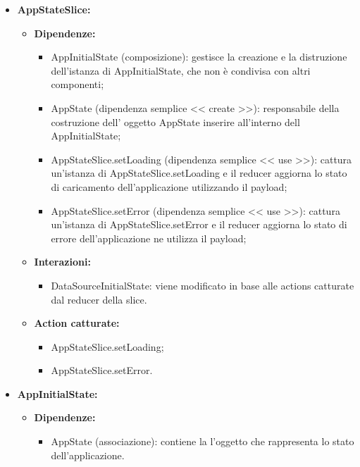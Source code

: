 \begin{itemize}
    \item \textbf{AppStateSlice:}
    \begin{itemize}
        \item \textbf{Dipendenze:}
        \begin{itemize}
            \item AppInitialState (composizione): gestisce la creazione e la distruzione dell'istanza di AppInitialState, che non è condivisa con altri componenti;
            \item AppState (dipendenza semplice << create >>): responsabile della costruzione dell' oggetto AppState inserire all’interno dell AppInitialState;
            \item AppStateSlice.setLoading (dipendenza semplice << use >>): cattura un’istanza di AppStateSlice.setLoading e il reducer aggiorna lo stato di caricamento dell'applicazione utilizzando il payload;
            \item AppStateSlice.setError (dipendenza semplice << use >>): cattura un’istanza di AppStateSlice.setError e il reducer aggiorna lo stato di errore dell'applicazione ne utilizza il payload;
        \end{itemize} 
        \item \textbf{Interazioni:}
        \begin{itemize}
            \item DataSourceInitialState: viene modificato in base alle actions catturate dal reducer della slice.
        \end{itemize} 
        \item \textbf{Action catturate:}
        \begin{itemize}
            \item AppStateSlice.setLoading;
            \item AppStateSlice.setError.
        \end{itemize} 
    \end{itemize}

    
    \item \textbf{AppInitialState:}
    \begin{itemize}
        \item \textbf{Dipendenze:}
        \begin{itemize}
            \item AppState (associazione): contiene la l'oggetto che rappresenta lo stato dell'applicazione.
        \end{itemize} 
    \end{itemize}


\end{itemize}
